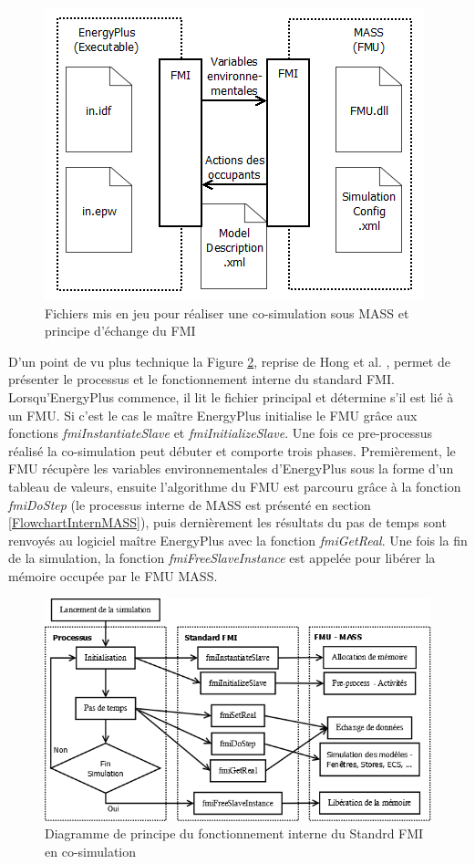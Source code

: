 \begin{figure}
\centering
\includegraphics[scale=0.8]{Images/MASSProcessus}
\caption{Fichiers mis en jeu pour réaliser une co-simulation sous MASS et principe d'échange du FMI}
\label{fig:MASSProcessus}
\end{figure}

D'un point de vu plus technique la Figure \ref{fig:diagramOfTheCo-Simulation}, reprise de Hong et al. \cite{Hong-16}, permet de présenter le processus et le fonctionnement interne du standard FMI. Lorsqu'EnergyPlus commence, il lit le fichier principal et détermine s'il est lié à un FMU. Si c'est le cas le maître EnergyPlus initialise le FMU grâce aux fonctions \textit{fmiInstantiateSlave} et \textit{fmiInitializeSlave}. Une fois ce pre-processus réalisé la co-simulation peut débuter et comporte trois phases. Premièrement, le FMU récupère les variables environnementales d'EnergyPlus sous la forme d'un tableau de valeurs, ensuite l'algorithme du FMU est parcouru grâce à la fonction \textit{fmiDoStep} (le processus interne de MASS est présenté en section \ref{FlowchartInternMASS}), puis dernièrement les résultats du pas de temps sont renvoyés au logiciel maître EnergyPlus avec la fonction \textit{fmiGetReal}. Une fois la fin de la simulation, la fonction \textit{fmiFreeSlaveInstance} est appelée pour libérer la mémoire occupée par le FMU MASS.

\begin{figure}
\centering
\includegraphics[scale=0.48]{Images/diagramOfTheCo-Simulation}
\caption{Diagramme de principe du fonctionnement interne du Standrd FMI en co-simulation}
\label{fig:diagramOfTheCo-Simulation}
\end{figure}

